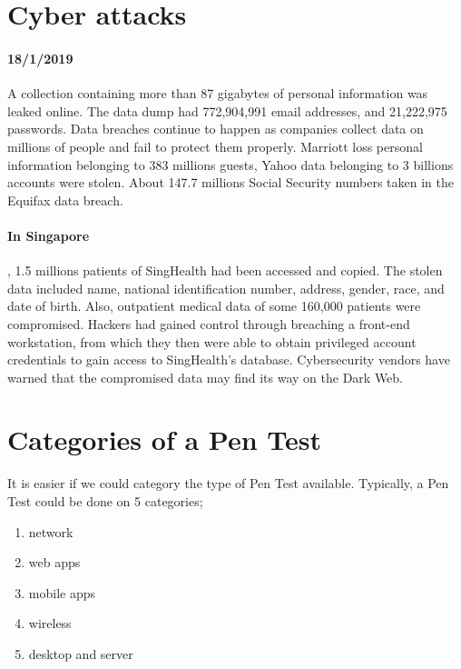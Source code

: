 \documentclass[7x9]{times}
\begin{document}
\section{Cyber attacks}

\paragraph{18/1/2019} A collection containing more than 87
gigabytes of personal information was leaked online. The
data dump had 772,904,991 email addresses, and 21,222,975
passwords. Data breaches continue to happen as companies
collect data on millions of people and fail to protect them
properly.  Marriott loss personal information belonging to
383 millions guests, Yahoo data belonging to 3 billions
accounts were stolen. About 147.7 millions Social Security
numbers taken in the Equifax data breach.


\paragraph{In Singapore}, 1.5 millions patients of
SingHealth had been accessed and copied. The stolen data
included name, national identification number, address,
gender, race, and date of birth. Also, outpatient medical
data of some 160,000 patients were compromised. Hackers had
gained control through breaching a front-end workstation,
from which they then were able to obtain privileged account
credentials to gain access to SingHealth's database.
Cybersecurity vendors have warned that the compromised data
may find its way on the Dark Web.



\section{Categories of a Pen Test}

It is easier if we could category the type of Pen Test available. Typically, 
a Pen Test could be done on 5 categories;
\begin{enumerate}
    \item network
    \item web apps
    \item mobile apps
    \item wireless
    \item desktop and server
\end{enumerate}
\end{document}
